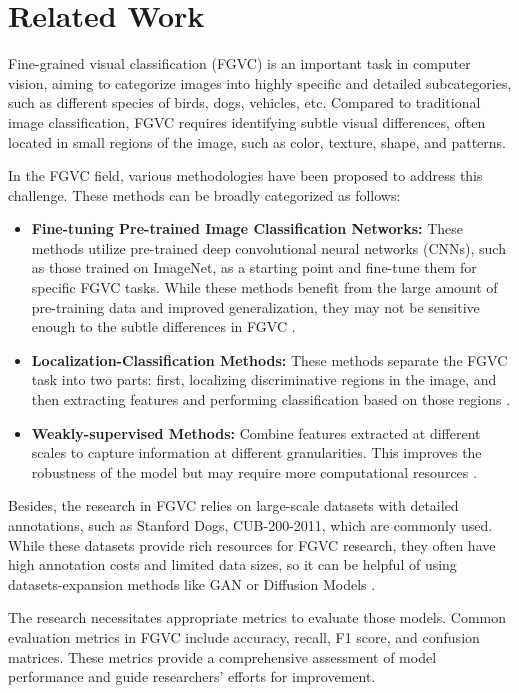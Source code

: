 \section{Related Work}
\label{sec:related_work}

Fine-grained visual classification (FGVC) is an important task in computer vision, aiming to categorize images into highly specific and detailed subcategories, such as different species of birds, dogs, vehicles, etc. Compared to traditional image classification, FGVC requires identifying subtle visual differences, often located in small regions of the image, such as color, texture, shape, and patterns.

In the FGVC field, various methodologies have been proposed to address this challenge. These methods can be broadly categorized as follows:
\begin{itemize}
    \item \textbf{Fine-tuning Pre-trained Image Classification Networks:} These methods utilize pre-trained deep convolutional neural networks (CNNs), such as those trained on ImageNet, as a starting point and fine-tune them for specific FGVC tasks. While these methods benefit from the large amount of pre-training data and improved generalization, they may not be sensitive enough to the subtle differences in FGVC \cite{lin2015bilinear}.
    \item \textbf{Localization-Classification Methods:} These methods separate the FGVC task into two parts: first, localizing discriminative regions in the image, and then extracting features and performing classification based on those regions \cite{zhang2016spda}.
    \item \textbf{Weakly-supervised Methods:} Combine features extracted at different scales to capture information at different granularities. This improves the robustness of the model but may require more computational resources \cite{zhou2016learning}.
\end{itemize}

Besides, the research in FGVC relies on large-scale datasets with detailed annotations, such as Stanford Dogs, CUB-200-2011, which are commonly used. While these datasets provide rich resources for FGVC research, they often have high annotation costs and limited data sizes, so it can be helpful of using datasets-expansion methods like GAN or Diffusion Models \cite{wang2018learning}.

The research necessitates appropriate metrics to evaluate those models. Common evaluation metrics in FGVC include accuracy, recall, F1 score, and confusion matrices. These metrics provide a comprehensive assessment of model performance and guide researchers' efforts for improvement.

